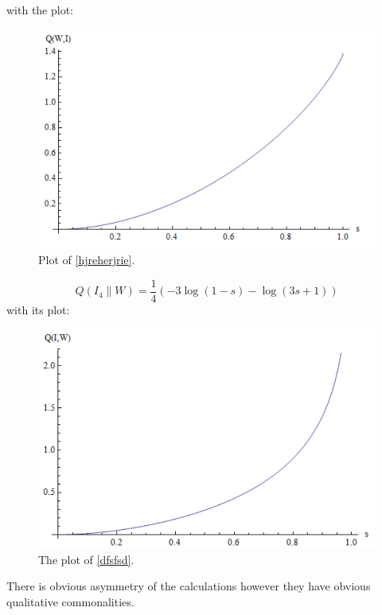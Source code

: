 with the plot:
\begin{figure}[h]
\begin{center}
\includegraphics[scale=0.8]{figures/WIrelativecalc.png}
\caption{Plot of \eqref{hjreherjrie}.}
\label{figr5}
\end{center}
\end{figure}
\begin{equation}
Q(I_4 \| W)=\frac{1}{4} (-3 \log (1-s)-\log (3 s+1))
\label{dfsfsd}
\end{equation}
with its plot:
\begin{figure}[h]
\begin{center}
\includegraphics[scale=0.8]{figures/IWrelateivecalc.png}
\caption{The plot of \eqref{dfsfsd}.}
\label{figr6}
\end{center}
\end{figure}
\noindent
There is obvious asymmetry of the calculations however they have obvious qualitative commonalities.
